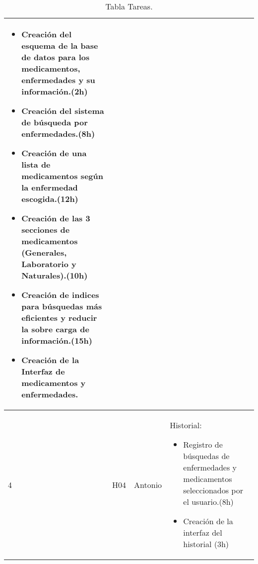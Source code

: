 \begin{table}[htb]
\begin{tabular}{|l|p{1.5cm}|p{2.5cm}|p{10cm}|}
	 \begin{itemize}
		\item Creación del esquema de la base de datos para los medicamentos, enfermedades y su información.(2h)
		\item Creación del sistema de búsqueda por enfermedades.(8h)
		\item Creación de una lista de medicamentos según la enfermedad escogida.(12h)
		\item Creación de las 3 secciones de medicamentos (Generales, Laboratorio y Naturales).(10h)
		\item Creación de indices para búsquedas más eficientes y reducir la sobre carga de información.(15h)
		\item Creación de la Interfaz de medicamentos y enfermedades.
	\end{itemize}\\ \hline

	
	4 & H04 & Antonio & Historial:
	\begin{itemize}
		\item Registro de búsquedas de enfermedades y medicamentos seleccionados por el usuario.(8h)
		\item Creación de la interfaz del historial (3h)
	\end{itemize}\\ \hline
	
	
\end{tabular}
\caption{Tabla Tareas.}
\label{tabla:Tareas}
\end{table}